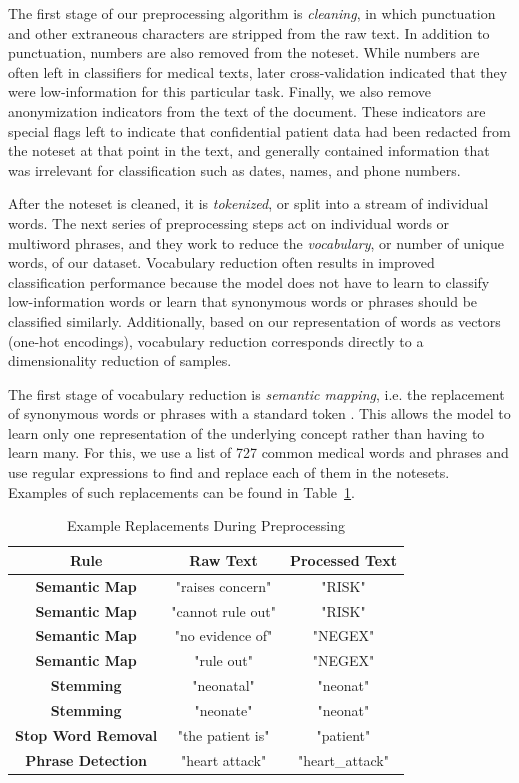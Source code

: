 \documentclass[conference]{IEEEtran}
\begin{document}
The first stage of our preprocessing algorithm is \textit{cleaning}, in which punctuation and other extraneous characters are stripped from the raw text. In addition to punctuation, numbers are also removed from the noteset. While numbers are often left in classifiers for medical texts, later cross-validation indicated that they were low-information for this particular task. Finally, we also remove anonymization indicators from the text of the document. These indicators are special flags left to indicate that confidential patient data had been redacted from the noteset at that point in the text, and generally contained information that was irrelevant for classification such as dates, names, and phone numbers.

After the noteset is cleaned, it is \textit{tokenized}, or split into a stream of individual words. The next series of preprocessing steps act on individual words or multiword phrases, and they work to reduce the \textit{vocabulary}, or number of unique words, of our dataset. Vocabulary reduction often results in improved classification performance \cite{Madsen} because the model does not have to learn to classify low-information words or learn that synonymous words or phrases should be classified similarly. Additionally, based on our representation of words as vectors (one-hot encodings), vocabulary reduction corresponds directly to a dimensionality reduction of samples.

The first stage of vocabulary reduction is \textit{semantic mapping}, i.e. the replacement of synonymous words or phrases with a standard token \cite{Banerjee}. This allows the model to learn only one representation of the underlying concept rather than having to learn many. For this, we use a list of 727 common medical words and phrases and use regular expressions to find and replace each of them in the notesets. Examples of such replacements can be found in Table~\ref{reptab}.
\begin{table}[htbp]
\caption{Example Replacements During Preprocessing}
\begin{center}
\begin{tabular}{ccc}
\textbf{Rule}&\textbf{Raw Text}&\textbf{Processed Text} \\
\hline
\textbf{Semantic Map} & "raises concern" & "RISK" \\
\textbf{Semantic Map} & "cannot rule out" & "RISK" \\
\textbf{Semantic Map} & "no evidence of" & "NEGEX" \\
\textbf{Semantic Map} & "rule out" & "NEGEX" \\
\textbf{Stemming} & "neonatal" & "neonat" \\
\textbf{Stemming} & "neonate" & "neonat" \\
\textbf{Stop Word Removal} & "the patient is" & "patient" \\
\textbf{Phrase Detection} & "heart attack" & "heart\_attack" \\
\end{tabular}
\label{reptab}
\end{center}
\end{table}
\end{document}

